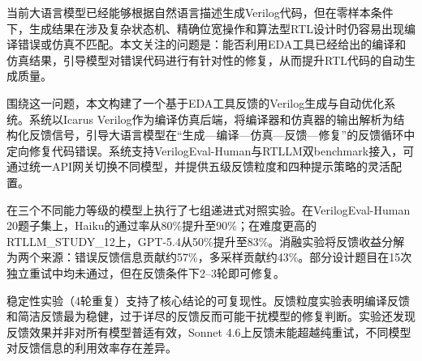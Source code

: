 
\begin{cabstract}
当前大语言模型已经能够根据自然语言描述生成Verilog代码，但在零样本条件下，生成结果在涉及复杂状态机、精确位宽操作和算法型RTL设计时仍容易出现编译错误或仿真不匹配。本文关注的问题是：能否利用EDA工具已经给出的编译和仿真结果，引导模型对错误代码进行有针对性的修复，从而提升RTL代码的自动生成质量。

围绕这一问题，本文构建了一个基于EDA工具反馈的Verilog生成与自动优化系统。系统以Icarus Verilog作为编译仿真后端，将编译器和仿真器的输出解析为结构化反馈信号，引导大语言模型在``生成—编译—仿真—反馈—修复''的反馈循环中定向修复代码错误。系统支持VerilogEval-Human与RTLLM双benchmark接入，可通过统一API网关切换不同模型，并提供五级反馈粒度和四种提示策略的灵活配置。

在三个不同能力等级的模型上执行了七组递进式对照实验。在VerilogEval-Human 20题子集上，Haiku的通过率从80\%提升至90\%；在难度更高的RTLLM\_STUDY\_12上，GPT-5.4从50\%提升至83\%。消融实验将反馈收益分解为两个来源：错误反馈信息贡献约57\%，多采样贡献约43\%。部分设计题目在15次独立重试中均未通过，但在反馈条件下2--3轮即可修复。

稳定性实验（4轮重复）支持了核心结论的可复现性。反馈粒度实验表明编译反馈和简洁反馈最为稳健，过于详尽的反馈反而可能干扰模型的修复判断。实验还发现反馈效果并非对所有模型普适有效，Sonnet 4.6上反馈未能超越纯重试，不同模型对反馈信息的利用效率存在差异。
\end{cabstract}

